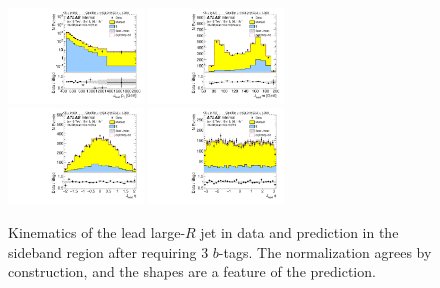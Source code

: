 \clearpage

\begin{figure}[htbp!]
\begin{center}
\includegraphics[width=0.32\textwidth,angle=-90]{figures/boosted/Sideband/b77_ThreeTag_Sideband_leadHCand_Pt_m_1.pdf}
\includegraphics[width=0.32\textwidth,angle=-90]{figures/boosted/Sideband/b77_ThreeTag_Sideband_leadHCand_Mass_s.pdf}\\
\includegraphics[width=0.32\textwidth,angle=-90]{figures/boosted/Sideband/b77_ThreeTag_Sideband_leadHCand_Eta.pdf}
\includegraphics[width=0.32\textwidth,angle=-90]{figures/boosted/Sideband/b77_ThreeTag_Sideband_leadHCand_Phi.pdf}
  \caption{Kinematics of the lead large-$R$ jet in data and prediction in the sideband region after requiring 3 $b$-tags. The normalization agrees by construction, and the shapes are a feature of the prediction.}
  \label{fig:boosted-3b-sideband-ak10-lead}
\end{center}
\end{figure}

